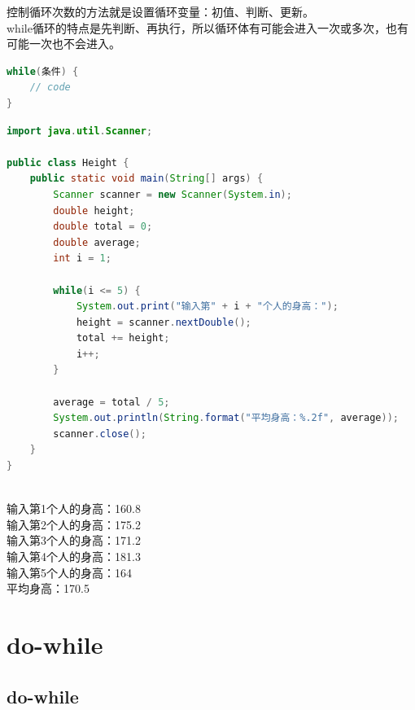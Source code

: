 控制循环次数的方法就是设置循环变量：初值、判断、更新。 \\

while循环的特点是先判断、再执行，所以循环体有可能会进入一次或多次，也有可能一次也不会进入。

\vspace{-0.5cm}

\begin{lstlisting}[language=Java]
while(条件) {
    // code
}
\end{lstlisting}

\vspace{0.5cm}


\begin{lstlisting}[language=Java]
import java.util.Scanner;

public class Height {
    public static void main(String[] args) {
        Scanner scanner = new Scanner(System.in);
        double height;
        double total = 0;
        double average;
        int i = 1;
        
        while(i <= 5) {
            System.out.print("输入第" + i + "个人的身高：");
            height = scanner.nextDouble();
            total += height;
            i++;
        }
        
        average = total / 5;
        System.out.println(String.format("平均身高：%.2f", average));
        scanner.close();
    }
}
\end{lstlisting}

\begin{tcolorbox}
	 \\
	输入第1个人的身高：160.8 \\
	输入第2个人的身高：175.2 \\
	输入第3个人的身高：171.2 \\
	输入第4个人的身高：181.3 \\
	输入第5个人的身高：164 \\
	平均身高：170.5
\end{tcolorbox}

\newpage

\section{do-while}

\subsection{do-while}

